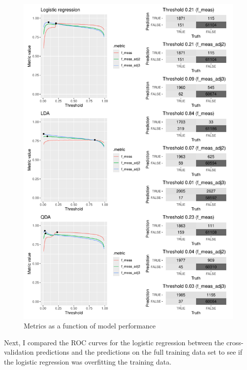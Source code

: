 \documentclass[
]{article}
\begin{document}
\begin{figure}[H]

{\centering \includegraphics[width=0.8\linewidth]{ProjectPart1_MERGED_files/figure-latex/print threshold graphs f_meas-1} 

}

\caption{Metrics as a function of model performance}\label{fig:print threshold graphs f_meas}
\end{figure}

Next, I compared the ROC curves for the logistic regression between the
cross-validation predictions and the predictions on the full training
data set to see if the logistic regression was overfitting the training
data.
\end{document}
